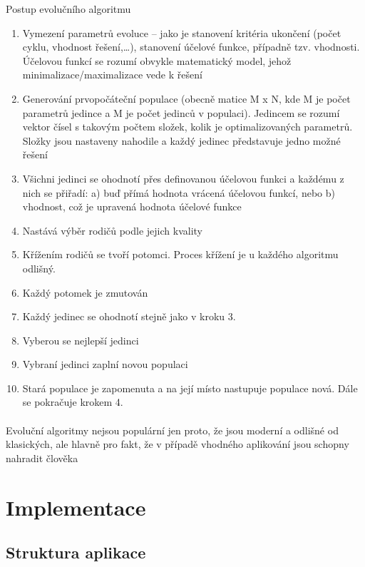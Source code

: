 \documentclass[bc,male,java,dept460]{diploma}		%
\begin{document}
\begin{example}
\label{priklad}
Postup evolučního algoritmu
\begin{enumerate}
\item Vymezení parametrů evoluce – jako je stanovení kritéria ukončení (počet cyklu, vhodnost řešení,…), stanovení účelové funkce, případně tzv. vhodnosti. Účelovou funkcí se rozumí obvykle matematický model, jehož minimalizace/maximalizace vede k řešení
\item Generování prvopočáteční populace (obecně matice M x N, kde M je počet parametrů jedince a M je počet jedinců v populaci). Jedincem se rozumí vektor čísel s takovým počtem složek, kolik je optimalizovaných parametrů. Složky jsou nastaveny nahodile a každý jedinec představuje jedno možné řešení
\item Všichni jedinci se ohodnotí přes definovanou účelovou funkci a každému z nich se přiřadí: a) buď přímá hodnota vrácená účelovou funkcí, nebo b) vhodnost, což je upravená hodnota účelové funkce
\item Nastává výběr rodičů podle jejich kvality
\item Křížením rodičů se tvoří potomci. Proces křížení je u každého algoritmu odlišný.
\item Každý potomek je zmutován
\item Každý jedinec se ohodnotí stejně jako v kroku 3.
\item Vyberou se nejlepší jedinci
\item Vybraní jedinci zaplní novou populaci
\item Stará populace je zapomenuta a na její místo nastupuje populace nová. Dále se pokračuje krokem 4.
\end{enumerate}

\paragraph*{}
Evoluční algoritmy nejsou populární jen proto, že jsou moderní a odlišné od klasických, ale hlavně pro fakt, že v případě vhodného aplikování jsou schopny nahradit člověka
\end{example}

\section{Implementace}

\subsection{Struktura aplikace}
\end{document}
